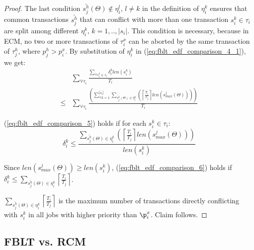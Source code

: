 \documentclass[prodmode,acmtecs]{acmsmall}
\begin{document}
\begin{proof}
The last condition $\bar{s_{j}^{h}}(\Theta)\not\in\eta_{i}^{l},\, l\ne k$
in the definition of $\eta_{i}^{k}$ ensures that common transactions $\bar{s_{j}^{h}}$
that can conflict with more than one transaction $s_{i}^{k}\in\tau_{i}$
are split among different $\eta_{i}^{k},\, k=1,..,|s_{i}|$. This
condition is necessary, because in ECM, no two or more transactions
of $\tau_{i}^{x}$ can be aborted by the same transaction of $\tau_{j}^{h}$, 
where $p_{j}^{h}>p_{i}^{x}$. By substitution of $\eta_{i}^{k}$ in
(\ref{eq:fblt_edf_comparison_4_1}), we get:
\begin{eqnarray}
 & \sum_{\forall\tau_{i}}\frac{\sum_{\forall s_{i}^{k}\in s_{i}}\delta_i^klen(s_{i}^{k})}{T_{i}}\label{eq:fblt_edf_comparison_5}\\
\le & \sum_{\forall\tau_{i}}\frac{\left(\sum_{\forall k=1}^{|s_{i}|}\sum_{\bar{s_{j}^{h}}(\Theta)\in\eta_{i}^{k}}\left(\left\lceil \frac{T_{i}}{T_{j}}\right\rceil len\left(s_{max}^{j}(\Theta)\right)\right)\right)}{T_{i}}\nonumber 
\end{eqnarray}

(\ref{eq:fblt_edf_comparison_5}) holds if for each $s_{i}^{k}\in\tau_{i}$:
\begin{equation}
\delta_{i}^{k}\le\frac{\sum_{\bar{s_{j}^{h}}(\Theta)\in\eta_{i}^{k}}\left(\left\lceil \frac{T_{i}}{T_{j}}\right\rceil len\left(s_{max}^{j}(\Theta)\right)\right)}{len(s_{i}^{k})}\label{eq:fblt_edf_comparison_6}
\end{equation}

Since $len\left(s_{max}^{j}(\Theta)\right)\ge len(s_{i}^{k})$, (\ref{eq:fblt_edf_comparison_6}) holds if $\delta_{i}^{k}\le \sum_{\bar{s_{j}^{h}}(\Theta)\in\eta_{i}^{k}}\left\lceil \frac{T_{i}}{T_{j}}\right\rceil$. 

$\sum_{\bar{s_{j}^{h}}(\Theta)\in\eta_{i}^{k}}\left\lceil \frac{T_{i}}{T_{j}}\right\rceil$
is the maximum number of transactions directly conflicting with $s_i^k$ in all jobs with higher priority than $\p_{i}^x$. Claim follows.
\end{proof}

\subsection{FBLT vs. RCM}

\end{document}
